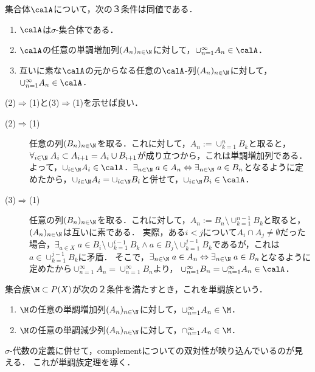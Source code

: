 \documentclass[uplatex, dvipdfmx]{jsreport}
\begin{document}
\begin{theorem}\label{thm-characterization-of-sigma-additivity}
    集合体$\calA$について，次の３条件は同値である．
    \begin{enumerate}
        \item $\calA$は$\sigma$-集合体である．
        \item $\calA$の任意の単調増加列$(A_n)_{n\in\N}$に対して，$\cup_{n=1}^\infty A_n\in\calA$．
        \item 互いに素な$\calA$の元からなる任意の$\calA$-列$(A_n)_{n\in\N}$に対して，$\cup^\infty_{n=1}A_n\in\calA$．
    \end{enumerate}
\end{theorem}
\begin{Proof}
    (2)$\Rightarrow$(1)と(3)$\Rightarrow$(1)を示せば良い．
    \begin{description}
        \item[(2)$\Rightarrow$(1)] 
        任意の列$(B_n)_{n\in\N}$を取る．これに対して，$A_n:=\cup_{k=1}^nB_k$と取ると，$\forall_{i\in\N}\;A_i\subset A_{i+1}=A_i\cup B_{i+1}$が成り立つから，これは単調増加列である．
        よって，$\cup_{i\in\N}A_i\in\calA$．$\exists_{n\in\N}\;a\in A_n\Leftrightarrow\exists_{n\in\N}\;a\in B_n$となるように定めたから，$\cup_{i\in\N}A_i=\cup_{i\in\N}B_i$と併せて，$\cup_{i\in\N}B_i\in\calA$．
        \item[(3)$\Rightarrow$(1)]
        任意の列$(B_n)_{n\in\N}$を取る．これに対して，$A_n:=B_n\setminus\cup_{k=1}^{n-1}B_k$と取ると，$(A_n)_{n\in\N}$は互いに素である．
        実際，ある$i<j$について$A_i\cap A_j\ne\emptyset$だった場合，$\exists_{a\in X}\;a\in B_i\setminus\cup_{k=1}^{i-1}B_k\land a\in B_j\setminus\cup^{j-1}_{k=1}B_k$であるが，これは$a\in\cup^{j-1}_{k=1}B_k$に矛盾．
        そこで，$\exists_{n\in\N}\;a\in A_n\Leftrightarrow\exists_{n\in\N}\;a\in B_n$となるように定めたから$\cup^\infty_{n=1}A_n=\cup^\infty_{n=1}B_n$より，
        $\cup_{n=1}^\infty B_n=\cup_{n=1}^\infty A_n\in\calA$．
    \end{description}
\end{Proof}

\begin{definition}
    集合族$\M\subset P(X)$が次の２条件を満たすとき，これを単調族という．
    \begin{enumerate}
        \item $\M$の任意の単調増加列$(A_n)_{n\in\N}$に対して，$\cup^\infty_{n=1}A_n\in\M$．
        \item $\M$の任意の単調減少列$(A_n)_{n\in\N}$に対して，$\cap^\infty_{n=1}A_n\in\M$．
    \end{enumerate}
\end{definition}
\begin{remarks}
    $\sigma$-代数の定義に併せて，complementについての双対性が映り込んでいるのが見える．
    これが単調族定理を導く．
\end{remarks}
\end{document}
